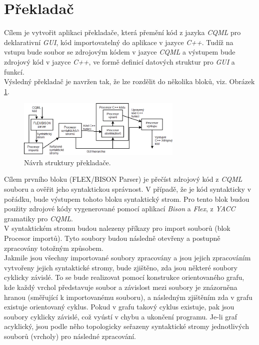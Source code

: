 \documentclass[11pt,twoside,a4paper]{book}
\begin{document}
\section{Překladač}
Cílem je vytvořit aplikaci překladače, která přemění kód z jazyka \textit{CQML} pro deklarativní \textit{GUI}, kód importovatelný do aplikace v jazyce \textit{C++}. Tudíž na vstupu bude soubor se zdrojovým kódem v jazyce \textit{CQML} a výstupem bude zdrojový kód v jazyce \textit{C++}, ve formě definicí datových struktur pro \textit{GUI} a funkcí. \\
Výsledný překladač je navržen tak, že lze rozdělit do několika bloků, viz. Obrázek \ref{fig:fig1}.\\
\begin{figure}[!ht]
\begin{center}
  \includegraphics[width=0.7\textwidth]{parserdiag}
\caption{{\label{fig:fig1}}Návrh struktury překladače.}
\end{center}
\end{figure}
Cílem prvního bloku (FLEX/BISON Parser) je přečíst zdrojový kód z \textit{CQML} souboru a ověřit jeho syntaktickou správnost. V případě, že je kód syntakticky v pořádku, bude výstupem tohoto bloku syntaktický strom. Pro tento blok budou použity zdrojové kódy vygenerované pomocí aplikací \textit{Bison} a \textit{Flex}, z \textit{YACC} gramatiky pro \textit{CQML}.\\
V syntaktickém stromu budou nalezeny příkazy pro import souborů (blok Procesor importů). Tyto soubory budou následně otevřeny a postupně zpracovány totožným způsobem.\\
Jakmile jsou všechny importované soubory zpracovány a jsou jejich zpracováním vytvořeny jejich syntaktické stromy, bude zjištěno, zda jsou některé soubory cyklicky závislé. To se bude realizovat pomocí konstrukce orientovaného grafu, kde každý vrchol představuje soubor a závislost mezi soubory je znázorněna hranou (směřující k importovanému souboru), a následným zjištěním zda v grafu existuje orientovaný cyklus. Pokud v grafu takový cyklus existuje, pak jsou soubory cyklicky závislé, což vyústí v chybu a ukončení programu. Je-li graf acyklický, jsou podle něho topologicky seřazeny syntaktické stromy jednotlivých souborů (vrcholy) pro následné zpracování.\\
\end{document}
